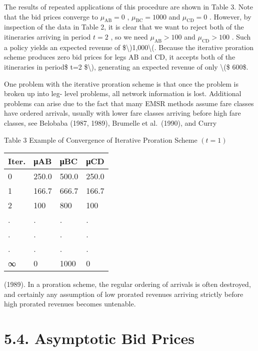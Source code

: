 The results of repeated applications of this procedure are shown in
Table 3. Note that the bid prices converge to \(\mu_{\mathrm{AB}} = 0\)
, \(\mu_{\mathrm{BC}} = 1000\) and \(\mu_{\mathrm{CD}} = 0\) . However,
by inspection of the data in Table 2, it is clear that we want to reject
both of the itineraries arriving in period \(t = 2\) , so we need
\(\mu_{\mathrm{AB}} > 100\) and \(\mu_{\mathrm{CD}} > 100\) . Such a
policy yields an expected revenue of
{\$\textbackslash)1,000\textbackslash(. Because the iterative proration
scheme produces zero bid prices for legs AB and CD, it accepts both of
the itineraries in period\$} t=2 {\$\textbackslash), generating an
expected revenue of only \textbackslash(\$} 600\$.

One problem with the iterative proration scheme is that once the problem
is broken up into leg- level problems, all network information is lost.
Additional problems can arise due to the fact that many EMSR methods
assume fare classes have ordered arrivals, usually with lower fare
classes arriving before high fare classes, see Belobaba (1987, 1989),
Brumelle et al.~(1990), and Curry

Table 3 Example of Convergence of Iterative Proration Scheme \((t = 1)\)

\begin{longtable}[]{@{}|l|l|l|l|@{}}
\toprule\noalign{}
\endhead
\bottomrule\noalign{}
\endlastfoot
\hline
Iter. & μAB & μBC & μCD \\
\hline
0 & 250.0 & 500.0 & 250.0 \\
\hline
1 & 166.7 & 666.7 & 166.7 \\
\hline
2 & 100 & 800 & 100 \\
\hline
. & . & . & . \\
\hline
. & . & . & . \\
\hline
. & . & . & . \\
\hline
∞ & 0 & 1000 & 0 \\
\hline
\end{longtable}

(1989). In a proration scheme, the regular ordering of arrivals is often
destroyed, and certainly any assumption of low prorated revenues
arriving strictly before high prorated revenues becomes untenable.

\section{5.4. Asymptotic Bid Prices}\label{asymptotic-bid-prices}

